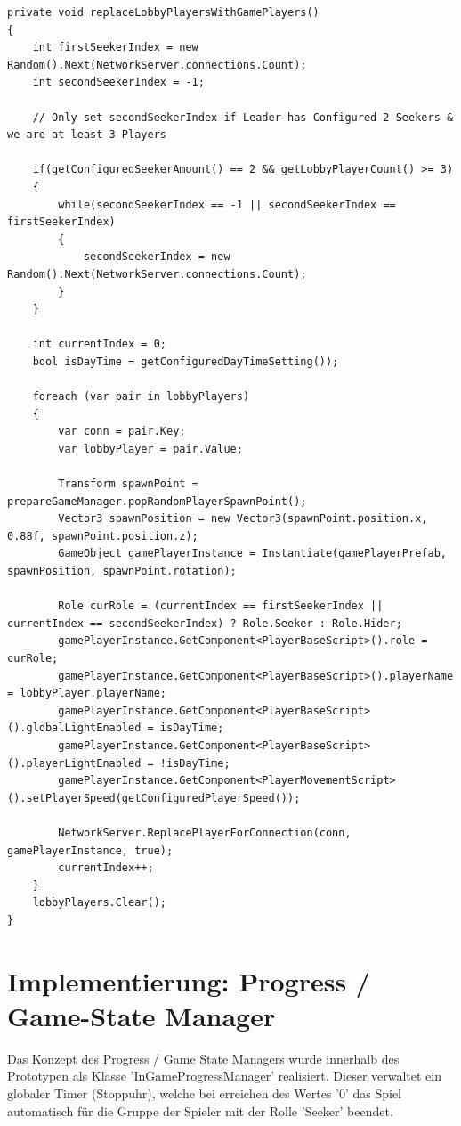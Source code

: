 \begin{lstlisting}[caption= GameNetworkManager.cs replaceLobbyPlayersWithGamePlayers()]
private void replaceLobbyPlayersWithGamePlayers()
{
	int firstSeekerIndex = new Random().Next(NetworkServer.connections.Count);
	int secondSeekerIndex = -1;
	
	// Only set secondSeekerIndex if Leader has Configured 2 Seekers & we are at least 3 Players
	
	if(getConfiguredSeekerAmount() == 2 && getLobbyPlayerCount() >= 3)
	{
		while(secondSeekerIndex == -1 || secondSeekerIndex == firstSeekerIndex)
		{
			secondSeekerIndex = new Random().Next(NetworkServer.connections.Count);
		}
	}
	
	int currentIndex = 0;
	bool isDayTime = getConfiguredDayTimeSetting());
	
	foreach (var pair in lobbyPlayers)
	{
		var conn = pair.Key;
		var lobbyPlayer = pair.Value;
		
		Transform spawnPoint = prepareGameManager.popRandomPlayerSpawnPoint();
		Vector3 spawnPosition = new Vector3(spawnPoint.position.x, 0.88f, spawnPoint.position.z);
		GameObject gamePlayerInstance = Instantiate(gamePlayerPrefab, spawnPosition, spawnPoint.rotation);
		
		Role curRole = (currentIndex == firstSeekerIndex || currentIndex == secondSeekerIndex) ? Role.Seeker : Role.Hider;
		gamePlayerInstance.GetComponent<PlayerBaseScript>().role = curRole;
		gamePlayerInstance.GetComponent<PlayerBaseScript>().playerName = lobbyPlayer.playerName;
		gamePlayerInstance.GetComponent<PlayerBaseScript>().globalLightEnabled = isDayTime;
		gamePlayerInstance.GetComponent<PlayerBaseScript>().playerLightEnabled = !isDayTime;
		gamePlayerInstance.GetComponent<PlayerMovementScript>().setPlayerSpeed(getConfiguredPlayerSpeed());
		
		NetworkServer.ReplacePlayerForConnection(conn, gamePlayerInstance, true);
		currentIndex++;
	}
	lobbyPlayers.Clear();
}
\end{lstlisting}


\section{Implementierung: Progress / Game-State Manager}
\label{Progress Manager}

Das Konzept des Progress / Game State Managers wurde innerhalb des Prototypen als Klasse 'InGameProgressManager' realisiert. Dieser verwaltet ein globaler Timer (Stoppuhr), welche bei erreichen des Wertes '0' das Spiel automatisch für die Gruppe der Spieler mit der Rolle 'Seeker' beendet.

